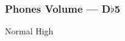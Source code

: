 \subsubsection{Phones Volume --- \UiKey{\SET}D$\flat$5}









































Normal
High

